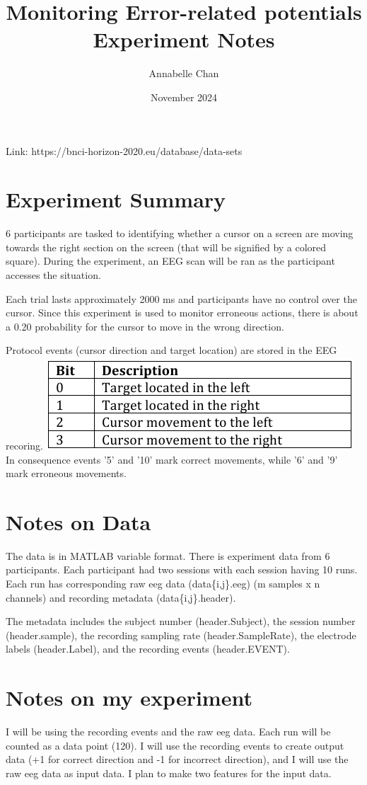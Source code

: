 \documentclass[12pt]{article}
\title{Monitoring Error-related potentials Experiment Notes}
\author{Annabelle Chan}
\date{November 2024}
\begin{document}
\maketitle
Link: https://bnci-horizon-2020.eu/database/data-sets\newline
\section{Experiment Summary}
6 participants are tasked to identifying whether a cursor on a screen are moving towards the right section on the screen (that will be signified by a colored square). During the experiment, an EEG scan will be ran as the participant accesses the situation.

Each trial lasts approximately 2000 ms and participants have no control over the cursor. Since this experiment is used to monitor erroneous actions, there is about a 0.20 probability for the cursor to move in the wrong direction.

Protocol events (cursor direction and target location) are stored in the EEG recoring. 
\includegraphics[scale=1]{ProtocolEventTable}
In consequence events '5' and '10' mark correct movements, while '6' and '9' mark erroneous movements.

\section{Notes on Data}
The data is in MATLAB variable format. There is experiment data from 6 participants. Each participant had two sessions with each session having 10 runs. Each run has corresponding raw eeg data (data\{i,j\}.eeg) (m samples x n channels) and recording metadata (data\{i,j\}.header). 

The metadata includes the subject number (header.Subject), the session number (header.sample), the recording sampling rate (header.SampleRate), the electrode labels (header.Label), and the recording events (header.EVENT).

\section{Notes on my experiment}
I will be using the recording events and the raw eeg data. Each run will be counted as a data point (120). I will use the recording events to create output data (+1 for correct direction and -1 for incorrect direction), and I will use the raw eeg data as input data. I plan to make two features for the input data.
\end{document}
